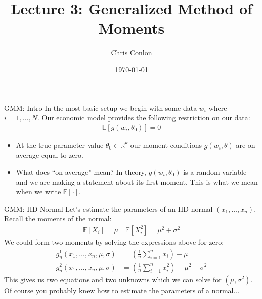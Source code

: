 \documentclass[aspectratio=169]{beamer}
\title{Lecture 3: Generalized Method of Moments}
\author{Chris Conlon }
\institute{NYU Stern }
\date{\today}
\begin{document}
\maketitle

\begin{frame}{GMM: Intro}
In the most basic setup we begin with some data $w_i$ where $i=1,\ldots,N$. Our economic model provides the following restriction on our data:
\begin{align*}
\mathbb{E}[g(w_i, \theta_0) ] =0
\end{align*}
\begin{itemize}
\item At the true parameter value $\theta_0\in \mathbb{R}^k$ our moment conditions $g(w_i,\theta)$ are on average equal to zero. 
\item What does ``on average'' mean?  In theory, $g(w_i,\theta_0)$ is a random variable and we are making a statement about its first moment.  This is what we mean when we write $\mathbb{E}[\cdot]$.
\end{itemize}
 \end{frame}
 
 \begin{frame}{GMM: IID Normal}
 Let's estimate the parameters of an IID normal $(x_1, \ldots, x_n)$. Recall the moments of the normal:
 \begin{align*}
 \mathbb{E}[X_i] = \mu \quad \mathbb{E}[X_i^2] = \mu^2 + \sigma^2
 \end{align*}
 We could form two moments by solving the expressions above for zero:
 \begin{align*}
 g_n^1(x_1,\ldots,x_n, \mu,\sigma)  &=  \left(\frac{1}{n} \sum_{i=1}^n x_i\right) - \mu\\
 g_n^2(x_1,\ldots,x_n, \mu,\sigma)  &=  \left(\frac{1}{n} \sum_{i=1}^n x_i^2 \right) - \mu^2 - \sigma^2
 \end{align*}
 This gives us two equations and two unknowns which we can solve for $(\mu,\sigma^2)$.\\
 Of course you probably knew how to estimate the parameters of a normal...
 \end{frame}
 
\end{document}
